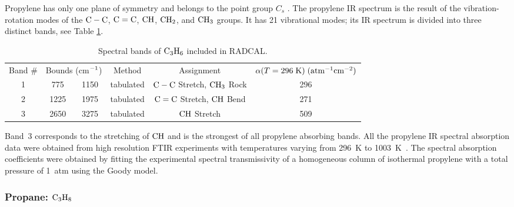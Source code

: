 Propylene has only one plane of symmetry and belongs to the point group $C_s$ \cite{Herzberg:1949}. The propylene IR spectrum is the result of the vibration-rotation modes of the $\rm C-C$, $\rm C=C$, $\rm CH$, $\rm CH_2$, and $\rm CH_3$ groups. It has 21 vibrational modes; its IR spectrum is divided into three distinct bands, see Table \ref{Table::C3H6}.
\begin{table}[ht]
   \centering
   \caption{Spectral bands of $\rm C_3H_6$ included in RADCAL.}
   \vspace{0.1in}
   \label{Table::C3H6}
   \begin{tabular}{|c|c|c|c|c|c|}
    \hline
    Band \# & \multicolumn{2}{|l|}{Bounds (cm$\rm ^{-1}$) } & Method & Assignment & $\alpha(T=296 \; {\rm K}) \; (\rm {atm^{-1} cm^{-2}})$\\
    \cline{1-6}
    1 & 775  & 1150 & tabulated &  $\rm C-C$ Stretch, $\rm CH_3$ Rock & 296 \\
    2 & 1225 & 1975 & tabulated &  $\rm C=C$ Stretch, $\rm CH$ Bend   & 271 \\
    3 & 2650 & 3275 & tabulated &  $\rm CH$ Stretch                   & 509 \\
    \hline
   \end{tabular}
\end{table}
Band~3 corresponds to the stretching of $\rm CH$ and is the strongest of all propylene absorbing bands. All the propylene IR spectral absorption data were obtained from high resolution FTIR experiments with temperatures varying from 296~K to 1003~K~\cite{Wakatsuki:2005}. The spectral absorption coefficients were obtained by fitting the experimental spectral transmissivity of a homogeneous column of isothermal propylene with a total pressure of 1~atm using the Goody model.

\subsubsection{Propane: $\rm C_3H_8$}

